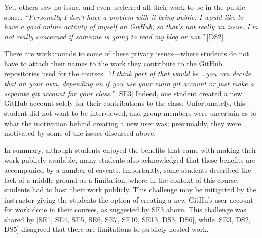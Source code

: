
Yet, others saw no issue, and even preferred all their work to be in the public space. \textit{``Personally I don't have a problem with it being public. I would like to have a good online activity of myself on GitHub, so that's not really an issue. I'm not really concerned if someone is going to read my blog or not.''} [DS2]

There are workarounds to some of these privacy issues---where students do not have to attach their names to the work they contribute to the GitHub repositories used for the courses. \textit{``I think part of that would be \ldots you can decide that on your own, depending on if you use your main git account or just make a separate git account for your class.''} [SE3] Indeed, one student created a new GitHub account solely for their contributions to the class. Unfortunately, this student did not want to be interviewed, and group members were uncertain as to what the motivation behind creating a new user was; presumably, they were motivated by some of the issues discussed above.

In summary, although students enjoyed the benefits that came with making their work publicly available, many students also acknowledged that these benefits are accompanied by a number of caveats. Importantly, some students described the lack of a middle ground as a limitation, where in the context of this course, students had to host their work publicly. This challenge may be mitigated by the instructor giving the students the option of creating a new GitHub user account for work done in their courses, as suggested by SE3 above. This challenge was shared by [SE1, SE4, SE5, SE6, SE7, SE10, SE13, DS3, DS6], while [SE3, DS2, DS5] disagreed that there are limitations to publicly hosted work. \\



